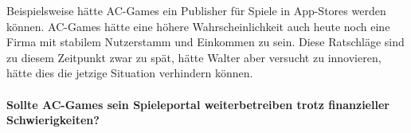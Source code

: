 Beispielsweise hätte AC-Games ein Publisher für Spiele in App-Stores werden können.
AC-Games hätte eine höhere Wahrscheinlichkeit auch heute noch eine Firma mit stabilem Nutzerstamm und Einkommen zu sein.
Diese Ratschläge sind zu diesem Zeitpunkt zwar zu spät, hätte Walter aber versucht zu innovieren, hätte dies die jetzige Situation verhindern können.

\paragraph*{Sollte AC-Games sein Spieleportal weiterbetreiben trotz finanzieller Schwierigkeiten?}
